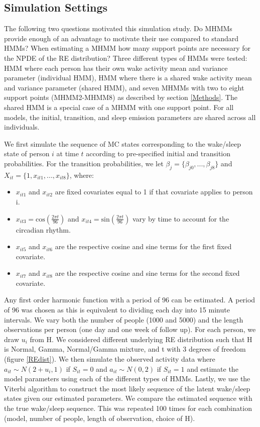 \documentclass{article}
\begin{document}
\subsection{Simulation Settings} \label{SimSettings}

The following two questions motivated this simulation study. Do MHMMs provide enough of an advantage to motivate their use compared to standard HMMs? When estimating a MHMM how many support points are necessary for the NPDE of the RE distribution? Three different types of HMMs were tested: HMM where each person has their own wake activity mean and variance parameter (individual HMM), HMM where there is a shared wake activity mean and variance parameter (shared HMM), and seven MHMMs with two to eight support points (MHMM2-MHMM8) as described by section \ref{Methods}. The shared HMM is a special case of a MHMM with one support point. For all models, the initial, transition, and sleep emission parameters are shared across all individuals.

We first simulate the sequence of MC states corresponding to the wake/sleep state of person $i$ at time $t$ according to pre-specified initial and transition probabilities. For the transition probabilities, we let $\beta_j = \{\beta_{j0}, ..., \beta_{j8}\}$ and $X_{it} = \{1, x_{it1}, ..., x_{it8}\}$, where:
\begin{itemize}
    \item $x_{it1}$ and $x_{it2}$ are fixed covariates equal to 1 if that covariate applies to person i.
    \item $x_{it3} = \text{cos}(\frac{2\pi t}{96})$ and $x_{it4} = \text{sin}(\frac{2\pi t}{96})$ vary by time to account for the circadian rhythm.
    \item $x_{it5}$ and $x_{it6}$ are the respective cosine and sine terms for the first fixed covariate.
    \item $x_{it7}$ and $x_{it8}$ are the respective cosine and sine terms for the second fixed covariate.
\end{itemize}

Any first order harmonic function with a period of 96 can be estimated. A period of 96 was chosen as this is equivalent to dividing each day into 15 minute intervals. We vary both the number of people (1000 and 5000) and the length observations per person (one day and one week of follow up). For each person, we draw $u_i$ from H. We considered different underlying RE distribution such that H is Normal, Gamma, Normal/Gamma mixture, and t with 3 degrees of freedom (figure \ref{REdist}). We then simulate the observed activity data where $a_{it} \sim N(2+u_i,1)$ if $S_{it}=0$ and $a_{it} \sim N(0,2)$ if $S_{it}=1$ and estimate the model parameters using each of the different types of HMMs. Lastly, we use the Viterbi algorithm to construct the most likely sequence of the latent wake/sleep states given our estimated parameters. We compare the estimated sequence with the true wake/sleep sequence. This was repeated 100 times for each combination (model, number of people, length of observation, choice of H).
\end{document}

